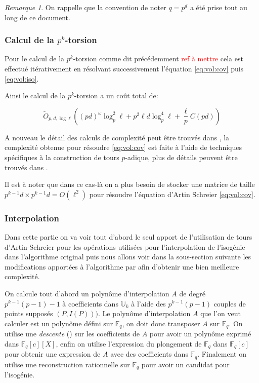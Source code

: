 \documentclass[10pt,a4paper]{book}
\theoremstyle{plain}
\theoremstyle{definition}
\theoremstyle{definition}
\theoremstyle{definition}
\theoremstyle{definition}
\theoremstyle{remark}
\newtheorem{rem}[thm]{Remarque}
\theoremstyle{remark}
\begin{document}
\begin{rem}
On rappelle que la convention de noter $q=p^d$ a été prise tout au long de ce document.
\end{rem}

\subsubsection{Calcul de la $p^k$-torsion}
Pour le calcul de la $p^k$-torsion comme dit précédemment \textcolor{red}{ref à mettre} cela est effectué itérativement en résolvant successivement l'équation \eqref{eq:vol:cov} puis \eqref{eq:vol:iso}.

Ainsi le calcul de la $p^k$-torsion a un coût total de: 

\begin{equation*}
\tilde{O}_{p,d,\log \ell}((pd)^{\omega}\log_p^2\ell +p^2\ell d \log_p^4\ell +\frac{\ell}{p}C(pd))
\end{equation*}

A nouveau le détail des calculs de complexité peut être trouvés dans \cite{DeFeo11}, la complexité obtenue pour résoudre \eqref{eq:vol:cov} est faite à l'aide de techniques spécifiques à la construction de tours $p$-adique, plus de détails peuvent être trouvés dans \cite{DeFeo-Shost'12}.

Il est à noter que dans ce cas-là on a plus besoin de stocker une matrice de taille $p^{k-1}d \times p^{k-1}d=O(\ell^2)$ pour résoudre l'équation d'Artin Schreier \eqref{eq:vol:cov}.

\subsubsection{Interpolation}
Dans cette partie on va voir tout d'abord le seul apport de l'utilisation de tours d'Artin-Schreier \cite{DeFeo-Shost'12} pour les opérations utilisées pour l'interpolation de l'isogénie dans l'algorithme original \cite{Couveignes96} puis nous allons voir dans la sous-section suivante les modifications apportées à l'algorithme par \cite[§5]{DeFeo11} afin d'obtenir une bien meilleure complexité.

On calcule tout d'abord un polynôme d'interpolation $A$ de degré $p^{k-1}(p-1)-1$ à coefficients dans $\mathbb{U}_k$ à l'aide des $p^{k-1}(p-1)$ couples de points supposés $(P,I(P)))$. Le polynôme d'interpolation $A$ que l'on veut calculer est un polynôme défini sur $\mathbb{F}_q$, on doit donc transposer $A$ sur $\mathbb{F}_q$. On utilise une \emph{descente} (\cite[push-down]{DeFeo-Shost'12}) sur les coefficients de $A$ pour avoir un polynôme exprimé dans $\mathbb{F}_q[c][X]$, enfin on utilise l'expression du plongement de $\mathbb{F}_q$ dans $\mathbb{F}_q[c]$ pour obtenir une expression de $A$ avec des coefficients dans $\mathbb{F}_q$. Finalement on utilise une reconstruction rationnelle sur $\mathbb{F}_q$ pour avoir un candidat pour l'isogénie.
\end{document}
